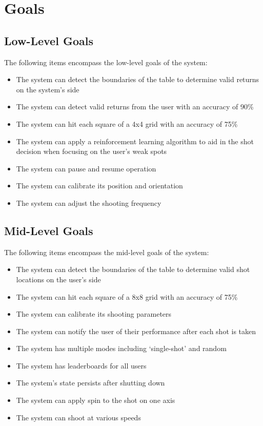 \documentclass[11pt]{article}
\begin{document}
\section{Goals}
\subsection{Low-Level Goals}
The following items encompass the low-level goals of the system:
\begin{itemize}
\item The system can detect the boundaries of the table to determine valid returns on the system's side
\item The system can detect valid returns from the user with an accuracy of 90\%
\item The system can hit each square of a 4x4 grid with an accuracy of 75\%
\item The system can apply a reinforcement learning algorithm to aid in the shot decision when focusing on the user's weak spots
\item The system can pause and resume operation
\item The system can calibrate its position and orientation
\item The system can adjust the shooting frequency
\end{itemize}
\subsection{Mid-Level Goals}
The following items encompass the mid-level goals of the system:
\begin{itemize}
\item The system can detect the boundaries of the table to determine valid shot locations on the user's side
\item The system can hit each square of a 8x8 grid with an accuracy of 75\%
\item The system can calibrate its shooting parameters
\item The system can notify the user of their performance after each shot is taken
\item The system has multiple modes including `single-shot' and random
\item The system has leaderboards for all users
\item The system's state persists after shutting down
\item The system can apply spin to the shot on one axis
\item The system can shoot at various speeds
\end{itemize}
\end{document}

